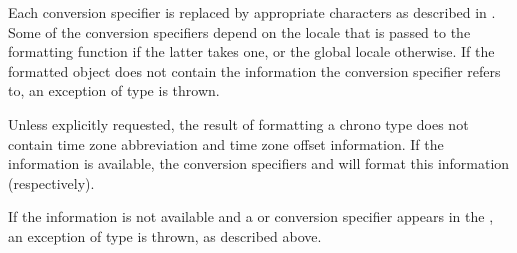 \pnum
Each conversion specifier 
is replaced by appropriate characters
as described in .
Some of the conversion specifiers
depend on the locale that is passed to the formatting function
if the latter takes one,
or the global locale otherwise.
If the formatted object does not contain the information
the conversion specifier refers to,
an exception of type  is thrown.

\pnum
Unless explicitly requested,
the result of formatting a chrono type
does not contain time zone abbreviation
and time zone offset information.
If the information is available,
the conversion specifiers  and 
will format this information (respectively).
\begin{note}
If the information is not available and
a  or 
conversion specifier appears in
the ,
an exception of type  is thrown,
as described above.
\end{note}


